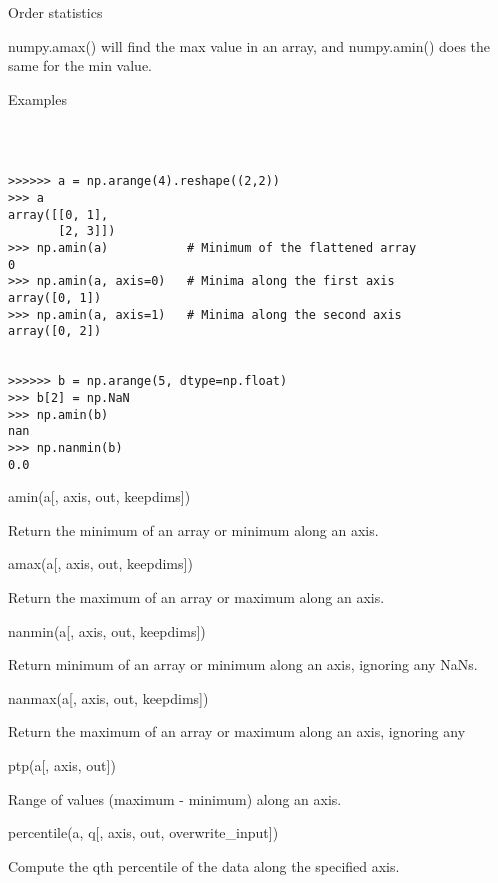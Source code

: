 Order statistics
 

numpy.amax() will find the max value in an array, and numpy.amin() does the same for the min value.

Examples
\begin{verbatim}

 

>>>>>> a = np.arange(4).reshape((2,2))
>>> a
array([[0, 1],
       [2, 3]])
>>> np.amin(a)           # Minimum of the flattened array
0
>>> np.amin(a, axis=0)   # Minima along the first axis
array([0, 1])
>>> np.amin(a, axis=1)   # Minima along the second axis
array([0, 2])
 

>>>>>> b = np.arange(5, dtype=np.float)
>>> b[2] = np.NaN
>>> np.amin(b)
nan
>>> np.nanmin(b)
0.0

\end{verbatim}


amin(a[, axis, out, keepdims])
 
Return the minimum of an array or minimum along an axis.
 


amax(a[, axis, out, keepdims])
 
Return the maximum of an array or maximum along an axis.
 


nanmin(a[, axis, out, keepdims])
 
Return minimum of an array or minimum along an axis, ignoring any NaNs.
 


nanmax(a[, axis, out, keepdims])
 
Return the maximum of an array or maximum along an axis, ignoring any
 


ptp(a[, axis, out])
 
Range of values (maximum - minimum) along an axis.
 


percentile(a, q[, axis, out, overwrite_input])
 
Compute the qth percentile of the data along the specified axis.
